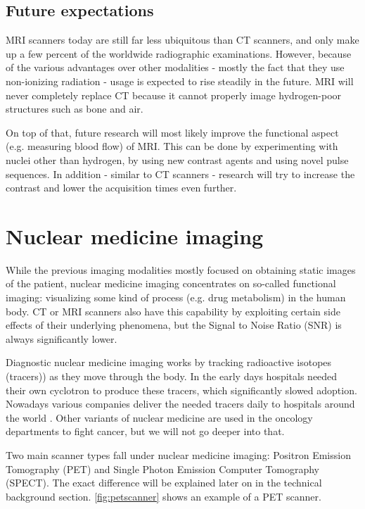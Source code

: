 \subsection{Future expectations}
MRI scanners today are still far less ubiquitous than CT scanners, and only make
up a few percent of the worldwide radiographic examinations. However, because of
the various advantages over other modalities - mostly the fact that they use
non-ionizing radiation - usage is expected to rise steadily in the future. MRI
will never completely replace CT because it cannot properly image hydrogen-poor
structures such as bone and air.

On top of that, future research will most likely improve the functional aspect
(e.g. measuring blood flow) of MRI. This can be done by experimenting with
nuclei other than hydrogen, by using new contrast agents and using novel pulse
sequences. In addition - similar to CT scanners - research will try to increase
the contrast and lower the acquisition times even further.

\section{Nuclear medicine imaging}
While the previous imaging modalities mostly focused on obtaining static images
of the patient, nuclear medicine imaging concentrates on so-called functional
imaging: visualizing some kind of process (e.g. drug metabolism) in the human
body. CT or MRI scanners also have this capability by exploiting certain side
effects of their underlying phenomena, but the Signal to Noise Ratio (SNR) is
always significantly lower.

Diagnostic nuclear medicine imaging works by tracking radioactive isotopes
(tracers)) as they move through the body. In the early days hospitals needed
their own cyclotron to produce these tracers, which significantly slowed
adoption. Nowadays various companies deliver the needed tracers daily to
hospitals around the world \cite{petreview}. Other variants of nuclear medicine
are used in the oncology departments to fight cancer, but we will not go deeper
into that.

Two main scanner types fall under nuclear medicine imaging: Positron Emission
Tomography (PET) and Single Photon Emission Computer Tomography (SPECT). The
exact difference will be explained later on in the technical background section.
\autoref{fig:petscanner} shows an example of a PET scanner.

